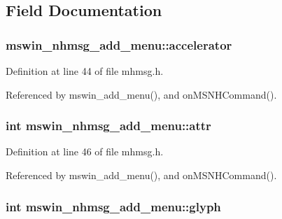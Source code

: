 \subsection{Field Documentation}
\hypertarget{structmswin__nhmsg__add__menu_abad930c46c0bc05bff9e362d191e6255}{
\subsubsection[{accelerator}]{ mswin\+\_\+nhmsg\+\_\+add\+\_\+menu\+::accelerator}}\label{structmswin__nhmsg__add__menu_abad930c46c0bc05bff9e362d191e6255}


Definition at line 44 of file mhmsg.\+h.



Referenced by mswin\+\_\+add\+\_\+menu(), and on\+M\+S\+N\+H\+Command().

\hypertarget{structmswin__nhmsg__add__menu_a01defd06f0fe00fc1b1986744ad288c9}{
\subsubsection[{attr}]{\setlength{\rightskip}{0pt plus 5cm}int mswin\+\_\+nhmsg\+\_\+add\+\_\+menu\+::attr}}\label{structmswin__nhmsg__add__menu_a01defd06f0fe00fc1b1986744ad288c9}


Definition at line 46 of file mhmsg.\+h.



Referenced by mswin\+\_\+add\+\_\+menu(), and on\+M\+S\+N\+H\+Command().

\hypertarget{structmswin__nhmsg__add__menu_a6be452cac105dee1671e9e61bafb58ae}{
\subsubsection[{glyph}]{\setlength{\rightskip}{0pt plus 5cm}int mswin\+\_\+nhmsg\+\_\+add\+\_\+menu\+::glyph}}\label{structmswin__nhmsg__add__menu_a6be452cac105dee1671e9e61bafb58ae}



